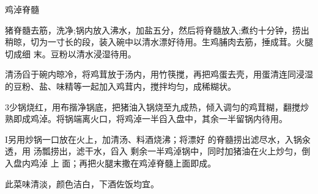 \begin{recipe}{鸡淖脊髓}

\ingredients


\cooking

\step 猪脊髓去筋，洗净;锅内放入沸水，加盐五分，然后将脊髓放入;煮约十分钟，捞出
稍晾，切为一寸长的段，装入碗中以清水漂好待用。生鸡脯肉去筋，捶成茸。火腿切成细
末。豆粉以清水浸湿待用。

\step 清汤舀于碗内晾冷，将鸡茸放于汤内，用竹筷搅，再把鸡蛋去壳，用蛋清连同浸湿
的豆粉、盐、味精等一起加入鸡茸内，搅拌均匀，成稀糊状。

\step 3少锅烧红，用布揩净锅底，把猪油入锅烧至九成热，倾入调匀的鸡茸糊，翻搅炒
熟即成鸡淖。将锅端离火口，将鸡淖一半舀入盘中，其余一半留锅内待用。

I另用炒锅一口放在火上，加清汤、料酒烧沸；将漂好 的脊髓捞出滤尽水，入锅汆透，用
汤瓢捞出，滤干水，舀入 剩余一半鸡淖锅中，同时加猪油在火上炒匀，倒入盘内鸡淖 上
面；再把火腿末撒在鸡淖脊髓上面即成。

\features

此菜味清淡，颜色洁白，下酒佐饭均宜。

\end{recipe}

